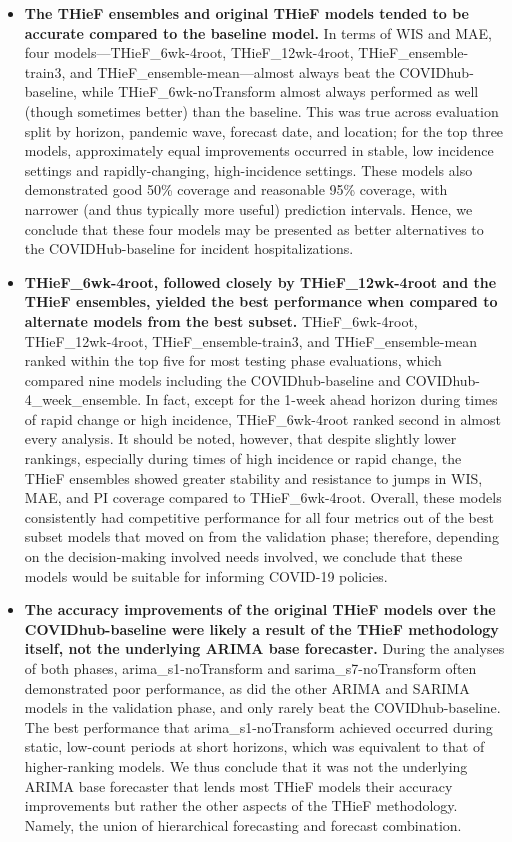 \documentclass[thesis]{umassthesis}  %
\begin{document}
\begin{itemize}
\item \textbf{The THieF ensembles and original THieF models tended to be accurate compared to the baseline model.} In terms of WIS and MAE, four models---THieF\_6wk-4root, THieF\_12wk-4root, THieF\_ensemble-train3, and \newline THieF\_ensemble-mean---almost always beat the COVIDhub-baseline, while \newline THieF\_6wk-noTransform almost always performed as well (though sometimes better) than the baseline. This was true across evaluation split by horizon, pandemic wave, forecast date, and location; for the top three models, approximately equal improvements occurred in stable, low incidence settings and rapidly-changing, high-incidence settings. These models also demonstrated good 50\% coverage and reasonable 95\% coverage, with narrower (and thus typically more useful) prediction intervals. Hence, we conclude that these four models may be presented as better alternatives to the COVIDHub-baseline for incident hospitalizations.

\item \textbf{THieF\_6wk-4root, followed closely by THieF\_12wk-4root and the THieF ensembles, yielded the best performance when compared to alternate models from the best subset.} THieF\_6wk-4root, THieF\_12wk-4root, THieF\_ensemble-train3, and THieF\_ensemble-mean ranked within the top five for most testing phase evaluations, which compared nine models including the COVIDhub-baseline and COVIDhub-4\_week\_ensemble. In fact, except for the 1-week ahead horizon during times of rapid change or high incidence, THieF\_6wk-4root ranked second in almost every analysis. It should be noted, however, that despite slightly lower rankings, especially during times of high incidence or rapid change, the THieF ensembles showed greater stability and resistance to jumps in WIS, MAE, and PI coverage compared to THieF\_6wk-4root. Overall, these models consistently had competitive performance for all four metrics out of the best subset models that moved on from the validation phase; therefore, depending on the decision-making involved needs involved, we conclude that these models would be suitable for informing COVID-19 policies.

\item \textbf{The accuracy improvements of the original THieF models over the COVIDhub-baseline were likely a result of the THieF methodology itself, not the underlying ARIMA base forecaster.} During the analyses of both phases, arima\_s1-noTransform and sarima\_s7-noTransform often demonstrated poor performance, as did the other ARIMA and SARIMA models in the validation phase, and only rarely beat the COVIDhub-baseline. The best performance that arima\_s1-noTransform achieved occurred during static, low-count periods at short horizons, which was equivalent to that of higher-ranking models. We thus conclude that it was not the underlying ARIMA base forecaster that lends most THieF models their accuracy improvements but rather the other aspects of the THieF methodology. Namely, the union of hierarchical forecasting and forecast combination.


\end{itemize}
\end{document}
